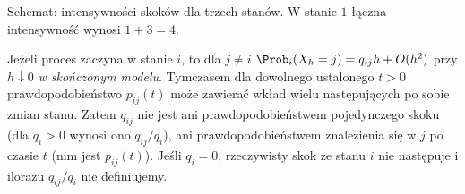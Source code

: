 \begin{center}
\par\smallskip\small Schemat: intensywności skoków dla trzech stanów.
W stanie $1$ łączna intensywność wynosi $1+3=4$.
\end{center}


\begin{uwaga}
Jeżeli proces zaczyna w stanie $i$, to dla $j\ne i$
$\Prob_i(X_h=j)=q_{ij}h+O(h^2)$ przy $h\downarrow0$
\emph{w skończonym modelu}. Tymczasem dla dowolnego
ustalonego $t>0$ prawdopodobieństwo $p_{ij}(t)$ może zawierać
wkład wielu następujących po sobie zmian stanu.
Zatem $q_{ij}$ nie jest ani prawdopodobieństwem pojedynczego
skoku (dla $q_i>0$ wynosi ono $q_{ij}/q_i$), ani
prawdopodobieństwem znalezienia się w $j$ po czasie $t$
(nim jest $p_{ij}(t)$). Jeśli $q_i=0$, rzeczywisty skok
ze stanu $i$ nie następuje i ilorazu $q_{ij}/q_i$
nie definiujemy.
\end{uwaga}

